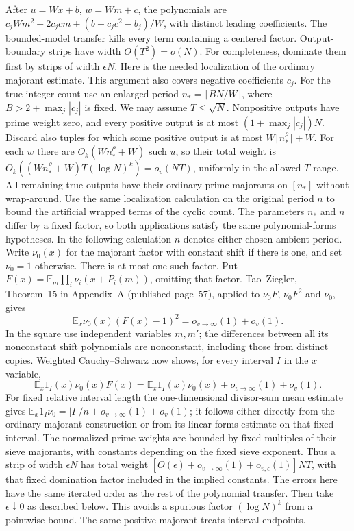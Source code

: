 \documentclass[11pt]{article}
\theoremstyle{definition}
\theoremstyle{remark}
\begin{document}
After $u=Wx+b$, $w=Wm+c$, the polynomials are
$c_jWm^2+2c_jcm+(b+c_jc^2-b_j)/W$, with distinct leading coefficients.
The bounded-model transfer kills every term containing a centered
factor. Output-boundary strips have width $O(T^2)=o(N)$.
For completeness, dominate them first by strips of width $\epsilon N$.
Here is the needed localization of the ordinary majorant estimate.
This argument also covers negative coefficients $c_j$. For the true
integer count use an enlarged period $n_* = \lceil B N/W\rceil$, where
$B>2+\max_j|c_j|$ is fixed. We may assume $T\leq\sqrt N$.
Nonpositive outputs have prime weight zero, and every positive output
is at most $(1+\max_j|c_j|)N$. Discard also tuples for which some
positive output is at most $W\lceil n_*^\rho\rceil+W$. For each $w$
there are $O_k(W n_*^\rho+W)$ such $u$, so their total weight is
$O_k((W n_*^\rho+W)T(\log N)^k)=o_v(NT)$, uniformly in the
allowed $T$ range. All remaining true outputs have their ordinary
prime majorants on $[n_*]$ without wrap-around. Use the same
localization calculation on the original period $n$ to bound the
artificial wrapped terms of the cyclic count. The parameters $n_*$
and $n$ differ by a fixed factor, so both applications satisfy the
same polynomial-forms hypotheses. In the following calculation $n$
denotes either chosen ambient period.
Write $\nu_0(x)$ for the majorant factor with constant shift if there
is one, and set $\nu_0=1$ otherwise. There is at most one such factor.
Put $F(x)=\mathbb E_m\prod_i\nu_i(x+P_i(m))$, omitting that factor.
Tao--Ziegler, Theorem~15 in Appendix~A (published page~57), applied to
$\nu_0F$, $\nu_0F^2$ and $\nu_0$, gives
\[
 \mathbb E_x\nu_0(x)(F(x)-1)^2=o_{v\to\infty}(1)+o_v(1).
\]
In the square use independent variables $m,m'$; the differences
between all its nonconstant shift polynomials are nonconstant,
including those from distinct copies. Weighted Cauchy--Schwarz now
shows, for every interval $I$ in the $x$ variable,
\[
 \mathbb E_x1_I(x)\nu_0(x)F(x)
 =\mathbb E_x1_I(x)\nu_0(x)+o_{v\to\infty}(1)+o_v(1).
\]
For fixed relative interval length the one-dimensional divisor-sum
mean estimate gives
$\mathbb E_x1_I\nu_0=|I|/n+o_{v\to\infty}(1)+o_v(1)$;
it follows either directly from the ordinary majorant construction
or from its linear-forms estimate on that fixed interval.
The normalized prime weights are bounded by fixed multiples of
their sieve majorants, with constants depending on the fixed sieve
exponent. Thus a strip of width $\epsilon N$ has total weight
$[O(\epsilon)+o_{v\to\infty}(1)+o_{v,\epsilon}(1)]NT$, with that
fixed domination factor included in the implied constants.
The errors here have the same iterated order as the rest of the
polynomial transfer. Then take $\epsilon\downarrow0$ as described
below. This avoids a spurious factor $(\log N)^k$ from a pointwise
bound. The same positive majorant treats interval endpoints.
\end{document}
